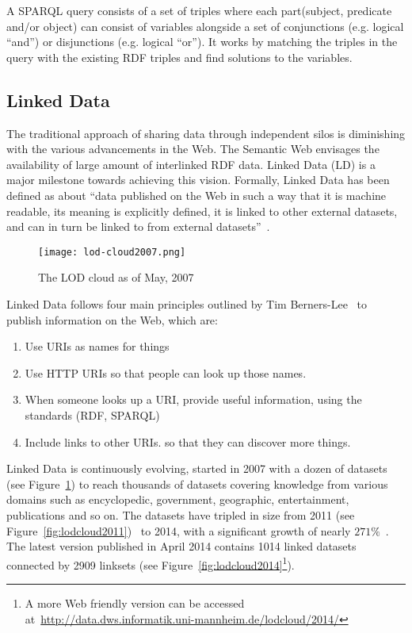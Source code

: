A SPARQL query consists of a set of triples where each part(subject, predicate and/or object) can consist of variables alongside a set of conjunctions (e.g. logical ``and'') or disjunctions (e.g. logical ``or''). It works by matching the triples in the query with the existing RDF triples and find solutions to the variables.

\subsection{Linked Data}

The traditional approach of sharing data through independent silos is diminishing with the various advancements in the Web. The Semantic Web envisages the availability of large amount of interlinked RDF data. Linked Data (LD) is a major milestone towards achieving this vision. Formally, Linked Data has been defined as about ``data published on the Web in such a way that it is machine readable, its meaning is explicitly defined, it is linked to other external datasets, and can in turn be linked to from external datasets''~\cite{Bizer:IJSWIS:09}.

\begin{figure}[ht!]
	\texttt{[image: lod-cloud2007.png]}
	\caption{The LOD cloud as of May, 2007}
	\label{fig:lodcloud2007}
\end{figure}

Linked Data follows four main principles outlined by Tim Berners-Lee~\cite{Berners-Lee:W3C:06} to publish information on the Web, which are:

\begin{enumerate}
	\item Use URIs as names for things
	\item Use HTTP URIs so that people can look up those names.
	\item When someone looks up a URI, provide useful information, using the standards (RDF, SPARQL)
	\item Include links to other URIs. so that they can discover more things.
\end{enumerate}

Linked Data is continuously evolving, started in 2007 with a dozen of datasets (see Figure~\ref{fig:lodcloud2007}) to reach thousands of datasets covering knowledge from various domains such as encyclopedic, government, geographic, entertainment, publications and so on. The datasets have tripled in size from 2011 (see Figure~\ref{fig:lodcloud2011})~\cite{Jentzsch:SOLOD:11} to 2014, with a significant growth of nearly $271\%$~\cite{Schmachtenberg:ISWC:14}. The latest version published in April 2014 contains 1014 linked datasets connected by 2909 linksets (see Figure~\ref{fig:lodcloud2014}\footnote{A more Web friendly version can be accessed at~\url{http://data.dws.informatik.uni-mannheim.de/lodcloud/2014/}}).

